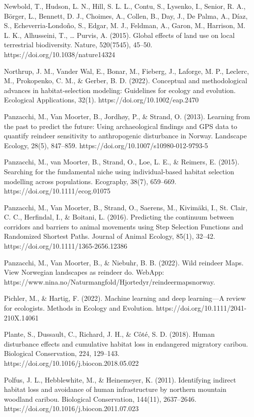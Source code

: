 \documentclass[titlepage]{article}
\begin{document}
Newbold, T., Hudson, L. N., Hill, S. L. L., Contu, S., Lysenko, I., Senior, R. A., Börger, L., Bennett, D. J., Choimes, A., Collen, B., Day, J., De Palma, A., Díaz, S., Echeverria-Londoño, S., Edgar, M. J., Feldman, A., Garon, M., Harrison, M. L. K., Alhusseini, T., … Purvis, A. (2015). Global effects of land use on local terrestrial biodiversity. Nature, 520(7545), 45–50. https://doi.org/10.1038/nature14324

Northrup, J. M., Vander Wal, E., Bonar, M., Fieberg, J., Laforge, M. P., Leclerc, M., Prokopenko, C. M., & Gerber, B. D. (2022). Conceptual and methodological advances in habitat‐selection modeling: Guidelines for ecology and evolution. Ecological Applications, 32(1). https://doi.org/10.1002/eap.2470

Panzacchi, M., Van Moorter, B., Jordhøy, P., & Strand, O. (2013). Learning from the past to predict the future: Using archaeological findings and GPS data to quantify reindeer sensitivity to anthropogenic disturbance in Norway. Landscape Ecology, 28(5), 847–859. https://doi.org/10.1007/s10980-012-9793-5

Panzacchi, M., van Moorter, B., Strand, O., Loe, L. E., & Reimers, E. (2015). Searching for the fundamental niche using individual-based habitat selection modelling across populations. Ecography, 38(7), 659–669. https://doi.org/10.1111/ecog.01075

Panzacchi, M., Van Moorter, B., Strand, O., Saerens, M., Kivimäki, I., St. Clair, C. C., Herfindal, I., & Boitani, L. (2016). Predicting the continuum between corridors and barriers to animal movements using Step Selection Functions and Randomized Shortest Paths. Journal of Animal Ecology, 85(1), 32–42. https://doi.org/10.1111/1365-2656.12386

Panzacchi, M., Van Moorter, B., & Niebuhr, B. B. (2022). Wild reindeer Maps. View Norwegian landscapes as reindeer do. WebApp: https://www.nina.no/Naturmangfold/Hjortedyr/reindeermapsnorway.

Pichler, M., & Hartig, F. (2022). Machine learning and deep learning—A review for ecologists. Methods in Ecology and Evolution. https://doi.org/10.1111/2041-210X.14061

Plante, S., Dussault, C., Richard, J. H., & Côté, S. D. (2018). Human disturbance effects and cumulative habitat loss in endangered migratory caribou. Biological Conservation, 224, 129–143. https://doi.org/10.1016/j.biocon.2018.05.022

Polfus, J. L., Hebblewhite, M., & Heinemeyer, K. (2011). Identifying indirect habitat loss and avoidance of human infrastructure by northern mountain woodland caribou. Biological Conservation, 144(11), 2637–2646. https://doi.org/10.1016/j.biocon.2011.07.023
\end{document}
